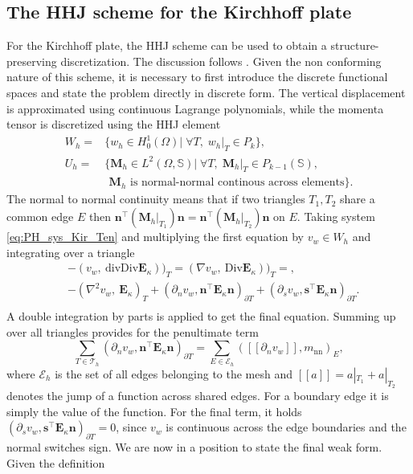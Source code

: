 \documentclass{ifacconf}
\begin{document}
\subsection{The HHJ scheme for the Kirchhoff plate}
For the Kirchhoff plate, the HHJ scheme can be used to obtain a structure-preserving discretization. The discussion follows \cite{arnold2019hellan}. Given the non conforming nature of this scheme, it is necessary to first introduce the discrete functional spaces and state the problem directly in discrete form. The vertical displacement is approximated using continuous Lagrange polynomials, while the momenta tensor is discretized using the HHJ element
\begin{equation}
\label{eq:HHJ}
\begin{aligned}
W_h = &\{w_h \in H^1_0(\Omega)| \; \forall T, \; w_h|_{T} \in P_{k} \}, \\
U_h = &\{\bm{M}_h \in L^2(\Omega, \mathbb{S})| \; \forall T, \; \bm{M}_h|_{T} \in P_{k-1}(\mathbb{S}) , \\ 
&\, \ \bm{M}_h \text{ is normal-normal continous across elements}\}.
\end{aligned}
\end{equation}
The normal to normal continuity means that if two triangles $T_1, T_2$ share a common edge $E$ then $\bm{n}^\top (\bm{M}_h|_{T_1}) \bm{n} = \bm{n}^\top (\bm{M}_h|_{T_2}) \bm{n}$ on $E$. Taking system \eqref{eq:PH_sys_Kir_Ten} and multiplying the first equation by $v_w \in W_h$ and integrating over a triangle
\begin{equation*}
	\begin{aligned}
	& - (v_w, \ \mathrm{div}\mathrm{Div} \bm{E}_\kappa))_{T} = (\nabla v_w, \ \mathrm{Div} \bm{E}_\kappa))_{T}=, \\
	& -(\nabla^2 v_w, \ \bm{E}_\kappa)_T + (\partial_n v_w, \bm{n}^\top\bm{E}_\kappa \bm{n})_{\partial T} + (\partial_s v_w, \bm{s}^\top\bm{E}_\kappa \bm{n})_{\partial T}. \\
	\end{aligned}
\end{equation*}
A double integration by parts is applied to get the final equation. Summing up over all triangles provides for the penultimate term
\begin{equation*}
\sum_{T \in \mathcal{T}_h} (\partial_n v_w, \bm{n}^\top\bm{E}_\kappa \bm{n})_{\partial T} = \sum_{E \in \mathcal{E}_h} ([\![\partial_n v_w]\!], m_{\text{nn}})_{E},
\end{equation*} 
where $\mathcal{E}_h$ is the set of all edges belonging to the mesh and $[\![a]\!] = a|_{T_1} + a|_{T_2}$ denotes the jump of a function across shared edges. For a boundary edge it is simply the value of the function. For the final term, it holds $(\partial_s v_w, \bm{s}^\top\bm{E}_\kappa \bm{n})_{\partial T}=0$, since $v_w$ is continuous across the edge boundaries and the normal switches sign. We are now in a position to state the final weak form. Given the definition
\end{document}
